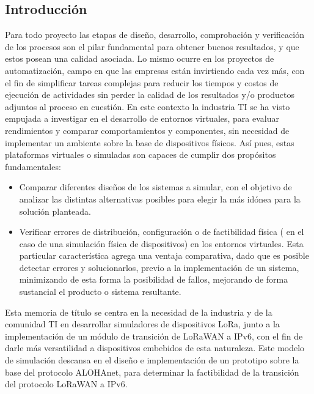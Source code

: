 \begin{justify}
\chapter{Introducción}

Para todo proyecto las etapas de diseño, desarrollo, comprobación y verificación de los procesos son el pilar fundamental para obtener buenos resultados, y que estos posean una calidad asociada. Lo mismo ocurre en los proyectos de automatización, campo en que las empresas están invirtiendo cada vez más, con el fin de simplificar tareas complejas para reducir los tiempos y costos de ejecución de actividades sin perder la calidad de los resultados y/o productos adjuntos al proceso en cuestión. En este contexto la industria TI se ha visto empujada a investigar en el desarrollo de entornos virtuales, para evaluar rendimientos y comparar comportamientos y componentes, sin necesidad de implementar un ambiente sobre la base de dispositivos físicos. Así pues, estas plataformas virtuales o simuladas son capaces de cumplir dos propósitos fundamentales:\\
\begin{itemize}
\item Comparar diferentes diseños de los sistemas a simular, con el objetivo de analizar las distintas alternativas posibles para elegir la más idónea para la solución planteada.
\item Verificar errores de distribución, configuración o de factibilidad física ( en el caso de una simulación física de dispositivos) en los entornos virtuales. Esta particular característica agrega una ventaja comparativa, dado que es posible detectar errores y solucionarlos, previo a la implementación de un sistema, minimizando de esta forma la posibilidad de fallos, mejorando de forma sustancial el producto o sistema resultante.
\end{itemize}
Esta memoria de título se centra en la necesidad de la industria y de la comunidad TI en desarrollar simuladores de dispositivos LoRa, junto a la implementación de un módulo de transición de LoRaWAN a IPv6, con el fin de darle más versatilidad a dispositivos embebidos de esta naturaleza. Este modelo de simulación descansa en el diseño e implementación de un prototipo sobre la base del protocolo ALOHAnet, para determinar la factibilidad de la transición del protocolo LoRaWAN a IPv6.


\end{justify}
